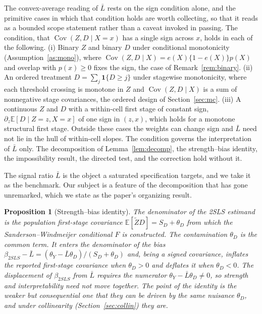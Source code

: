 \documentclass[preprint,11pt,authoryear]{elsarticle}
\newtheorem{proposition}{Proposition}
\theoremstyle{definition}
\newcommand{\E}{\mathbb{E}}
\newcommand{\Cov}{\operatorname{Cov}}
\newcommand{\Ztil}{\tilde{Z}}
\begin{document}
The convex-average reading of $\bar L$ rests on the sign condition alone, and the
primitive cases in which that condition holds are worth collecting, so that it reads as a
bounded scope statement rather than a caveat invoked in passing. The condition, that
$\Cov(Z,D\mid X=x)$ has a single sign across $x$, holds in each of the following. (i)
Binary $Z$ and binary $D$ under conditional monotonicity (Assumption~\ref{as:mono}), where
$\Cov(Z,D\mid X)=e(X)\{1-e(X)\}p(X)$ and overlap with $p(x)\ge0$ fixes the sign, the case
of Remark~\ref{rem:binary}. (ii) An ordered treatment $D=\sum_j\mathbf 1\{D\ge j\}$ under
stagewise monotonicity, where each threshold crossing is monotone in $Z$ and
$\Cov(Z,D\mid X)$ is a sum of nonnegative stage covariances, the ordered design of
Section~\ref{sec:mc}. (iii) A continuous $Z$ and $D$ with a within-cell first stage of
constant sign, $\partial_z\E[D\mid Z=z,X=x]$ of one sign in $(z,x)$, which holds for a
monotone structural first stage. Outside these cases the weights can change sign and
$\bar L$ need not lie in the hull of within-cell slopes. The condition governs the
interpretation of $\bar L$ only. The decomposition of Lemma~\ref{lem:decomp}, the
strength--bias identity, the impossibility result, the directed test, and the correction
hold without it.

The signal ratio $\bar L$ is the object a saturated specification targets, and we take
it as the benchmark. Our subject is a feature of the decomposition that has gone
unremarked, which we state as the paper's organizing result.

\begin{proposition}[Strength--bias identity]\label{prop:identity}
The denominator of the 2SLS estimand is the population first-stage covariance
$\E[\Ztil D]=S_D+\theta_D$ from which the Sanderson--Windmeijer conditional $F$ is
constructed. The contamination $\theta_D$ is the common term. It enters the
denominator of the bias $\beta_{2SLS}-\bar L=(\theta_Y-\bar L\theta_D)/(S_D+\theta_D)$
and, being a signed covariance, inflates the reported first-stage covariance when
$\theta_D>0$ and deflates it when $\theta_D<0$. The displacement of $\beta_{2SLS}$
from $\bar L$ requires the numerator $\theta_Y-\bar L\theta_D\neq0$, so strength and
interpretability need not move together. The point of the identity is the weaker but
consequential one that they \emph{can} be driven by the same nuisance $\theta_D$, and
under collinearity (Section~\ref{sec:collin}) they are.
\end{proposition}
\end{document}
